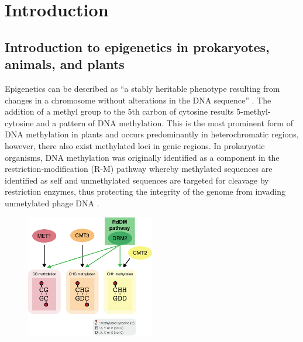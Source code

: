 
\chapter{Introduction}  %

\ifpdf
    \graphicspath{{Chapter1/Figs/Raster/}{Chapter1/Figs/PDF/}{Chapter1/Figs/}}
\else
    \graphicspath{{Chapter1/Figs/Vector/}{Chapter1/Figs/}}
\fi


\section{Introduction to epigenetics in prokaryotes, animals, and plants } %

Epigenetics can be described as “a stably heritable phenotype resulting from changes in a chromosome without alterations in the DNA sequence” \citep{RN135}. The addition of a methyl group to the 5th carbon of cytosine results 5-methyl-cytosine and a pattern of DNA methylation. This is the most prominent form of DNA methylation in plants and occurs predominantly in heterochromatic regions, however, there also exist methylated loci in genic regions. In prokaryotic organisms, DNA methylation was originally identified as a component in the restriction-modification (R-M) pathway whereby methylated sequences are identified as self and unmethylated sequences are targeted for cleavage by restriction enzymes, thus protecting the integrity of the genome from invading unmetylated phage DNA  \citep{RN96,RN95}.

\begin{figure}[htbp!] 
\centering    
    \includegraphics[width=0.5\textwidth]{Chapter1/Figs/base_mods.png}
\caption{}
\label{fig:meth_pathways}
\captionsetup{font=small}
    \caption*{}
\end{figure}

